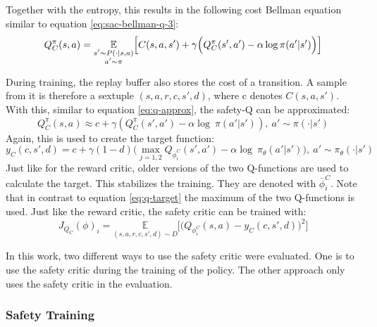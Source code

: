 Together with the entropy, this results in the following cost Bellman equation similar to equation \ref{eq:sac-bellman-q-3}:
\begin{equation}
    Q_C^\pi(s,a) = \underset{\begin{subarray}{c}
        s'\sim P(\cdot|s,a)\\
        a'\sim\pi
    \end{subarray}}{\mathbb{E}}\Big[C(s,a,s') + \gamma\Big(Q_C^\pi(s',a') - \alpha \log\pi(a'|s')\Big)\Big]
    \label{eq:sac-cost-bellman}
\end{equation}

During training, the replay buffer also stores the cost of a transition. A sample from it is therefore a sextuple $(s,a,r,c,s',d)$, where c denotes $C(s,a,s')$. With this, similar to equation \ref{eq:q-approx}, the safety-Q can be approximated:
\begin{equation}
    Q_C^\pi(s,a) \approx c+\gamma(Q_C^\pi(s',a')-\alpha \log~ \pi(a'|s')),~ a'\sim\pi(\cdot|s')
    \label{eq:safety-q-approx}
\end{equation}
Again, this is used to create the target function:
\begin{equation}
    y_C(c,s',d) = c+\gamma(1-d)\Big(\underset{j=1,2}{\max}Q_{\overline{\phi}^C_i}(s',a')-\alpha \log~ \pi_\theta(a'|s')\Big),~ a'\sim\pi_\theta(\cdot|s')
    \label{eq:safety-q-target}
\end{equation}
Just like for the reward critic, older versions of the two Q-functions are used to calculate the target. This stabilizes the training. They are denoted with ${\overline{\phi}^C_i}$. Note that in contrast to equation \ref{eq:q-target} the maximum of the two Q-functions is used.
Just like the reward critic, the safety critic can be trained with:
\begin{equation}
    J_{Q_C}(\phi)_i = \underset{(s,a,r,c,s',d)\sim D}{\mathbb{E}}\Big[\Big(Q_{\phi^C_i}(s,a)-y_C(c,s',d)\Big)^2\Big]
\end{equation}

In this work, two different ways to use the safety critic were evaluated. One is to use the safety critic during the training of the policy. The other approach only uses the safety critic in the evaluation.

\subsubsection{Safety Training}
\label{sec:safety-training}

